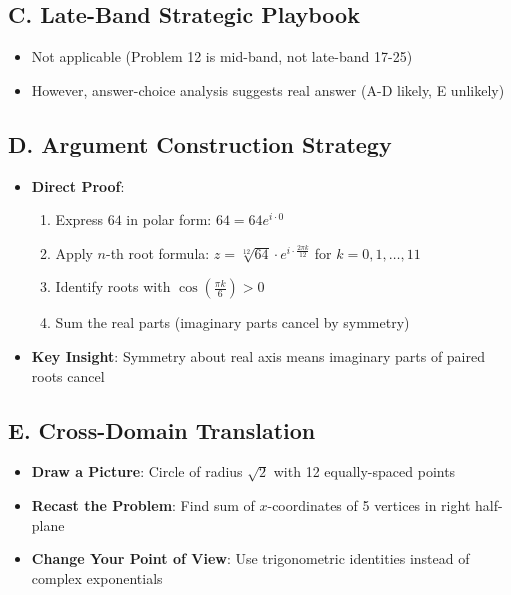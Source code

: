 \documentclass[11pt]{article}
\begin{document}
\begin{strategicbox}
\subsection*{C. Late-Band Strategic Playbook}
\begin{itemize}[leftmargin=*]
    \item Not applicable (Problem 12 is mid-band, not late-band 17-25)
    \item However, answer-choice analysis suggests real answer (A-D likely, E unlikely)
\end{itemize}

\subsection*{D. Argument Construction Strategy}
\begin{itemize}[leftmargin=*]
    \item \textbf{Direct Proof}: 
    \begin{enumerate}
        \item Express $64$ in polar form: $64 = 64e^{i \cdot 0}$
        \item Apply $n$-th root formula: $z = \sqrt[12]{64} \cdot e^{i \cdot \frac{2\pi k}{12}}$ for $k=0,1,\ldots,11$
        \item Identify roots with $\cos(\frac{\pi k}{6}) > 0$
        \item Sum the real parts (imaginary parts cancel by symmetry)
    \end{enumerate}
    \item \textbf{Key Insight}: Symmetry about real axis means imaginary parts of paired roots cancel
\end{itemize}

\subsection*{E. Cross-Domain Translation}
\begin{itemize}[leftmargin=*]
    \item \textbf{Draw a Picture}: Circle of radius $\sqrt{2}$ with 12 equally-spaced points
    \item \textbf{Recast the Problem}: Find sum of $x$-coordinates of 5 vertices in right half-plane
    \item \textbf{Change Your Point of View}: Use trigonometric identities instead of complex exponentials
\end{itemize}
\end{strategicbox}
\end{document}
